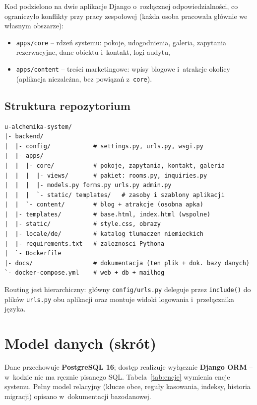\documentclass[12pt,a4paper]{article}
\begin{document}
Kod podzielono na dwie aplikacje Django o~rozłącznej odpowiedzialności, co
ograniczyło konflikty przy pracy zespołowej (każda osoba pracowała głównie we
własnym obszarze):

\begin{itemize}[nosep]
  \item \texttt{apps/core} -- rdzeń systemu: pokoje, udogodnienia, galeria,
    zapytania rezerwacyjne, dane obiektu i~kontakt, logi audytu,
  \item \texttt{apps/content} -- treści marketingowe: wpisy blogowe i~atrakcje
    okolicy (aplikacja niezależna, bez powiązań z~\texttt{core}).
\end{itemize}

\subsection{Struktura repozytorium}

\begin{lstlisting}[style=consolestyle, caption={Najważniejsze elementy drzewa katalogów}]
u-alchemika-system/
|- backend/
|  |- config/            # settings.py, urls.py, wsgi.py
|  |- apps/
|  |  |- core/           # pokoje, zapytania, kontakt, galeria
|  |  |  |- views/       # pakiet: rooms.py, inquiries.py
|  |  |  |- models.py forms.py urls.py admin.py
|  |  |  `- static/ templates/   # zasoby i szablony aplikacji
|  |  `- content/        # blog + atrakcje (osobna apka)
|  |- templates/         # base.html, index.html (wspolne)
|  |- static/            # style.css, obrazy
|  |- locale/de/         # katalog tlumaczen niemieckich
|  |- requirements.txt   # zaleznosci Pythona
|  `- Dockerfile
|- docs/                 # dokumentacja (ten plik + dok. bazy danych)
`- docker-compose.yml    # web + db + mailhog
\end{lstlisting}

Routing jest hierarchiczny: główny \texttt{config/urls.py} deleguje przez
\texttt{include()} do plików \texttt{urls.py} obu aplikacji oraz montuje widoki
logowania i~przełącznika języka.

\section{Model danych (skrót)}
\label{sec:dane}

Dane przechowuje \textbf{PostgreSQL 16}; dostęp realizuje wyłącznie \textbf{Django
ORM} -- w~kodzie nie ma ręcznie pisanego SQL. Tabela~\ref{tab:encje} wymienia
encje systemu. Pełny model relacyjny (klucze obce, reguły kasowania, indeksy,
historia migracji) opisano w~dokumentacji bazodanowej.
\end{document}
